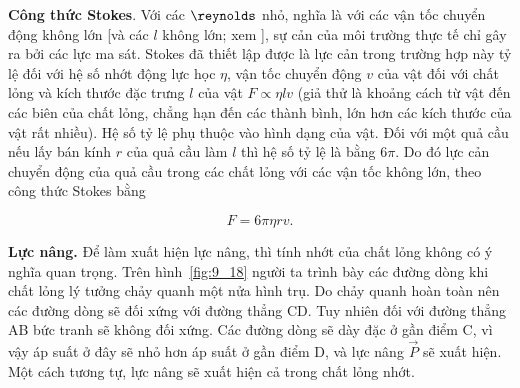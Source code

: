 \textbf{Công thức Stokes}. Với các $\reynolds$ nhỏ, nghĩa là với các vận tốc chuyển động không lớn [và các $l$ không lớn; xem ], sự cản của môi trường thực tế chỉ gây ra bởi các lực ma sát. Stokes đã thiết lập được là lực cản trong trường hợp này tỷ lệ đối với hệ số nhớt động lực học $\eta$, vận tốc chuyển động $v$ của vật đối với chất lỏng và kích thước đặc trưng $l$ của vật $F\propto\eta lv$ (giả thử là khoảng cách từ vật đến các biên của chất lỏng, chẳng hạn đến các thành bình, lớn hơn các kích thước của vật rất nhiều). Hệ số tỷ lệ phụ thuộc vào hình dạng của vật. Đối với một quả cầu nếu lấy bán kính $r$ của quả cầu làm $l$ thì hệ số tỷ lệ là bằng $6\pi$. Do đó lực cản chuyển động của quả cầu trong các chất lỏng với các vận tốc không lớn, theo công thức Stokes bằng 

\begin{equation}\label{eq:9_24}
	F = 6\pi\eta rv.
\end{equation}


\textbf{Lực nâng.} Để làm xuất hiện lực nâng, thì tính nhớt của chất lỏng không có ý nghĩa quan trọng. Trên hình~\ref{fig:9_18} người ta trình bày các đường dòng khi chất lỏng lý tưởng chảy quanh một nửa hình trụ. Do chảy quanh hoàn toàn nên các đường dòng sẽ đối xứng với đường thẳng CD. Tuy nhiên đối với đường thẳng AB bức tranh sẽ không đối xứng. Các đường dòng sẽ dày đặc ở gần điểm C, vì vậy áp suất ở đây sẽ nhỏ hơn áp suất ở gần điểm D, và lực nâng $\vec{P}$ sẽ xuất hiện. Một cách tương tự, lực nâng sẽ xuất hiện cả trong chất lỏng nhớt.

